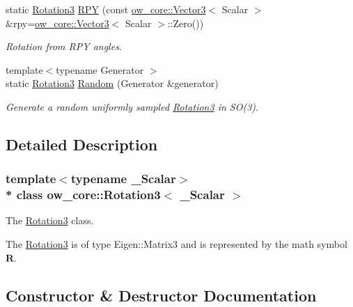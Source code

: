 \begin{DoxyCompactItemize}
static \hyperlink{classow__core_1_1Rotation3}{Rotation3} \hyperlink{classow__core_1_1Rotation3_ac97f635a2d188808d45496941384698a}{R\+PY} (const \hyperlink{classow__core_1_1Vector3}{ow\+\_\+core\+::\+Vector3}$<$ Scalar $>$ \&rpy=\hyperlink{classow__core_1_1Vector3}{ow\+\_\+core\+::\+Vector3}$<$ Scalar $>$\+::Zero())
\begin{DoxyCompactList}\small\item\em Rotation from R\+PY angles. \end{DoxyCompactList}\item 
{\footnotesize template$<$typename Generator $>$ }\\static \hyperlink{classow__core_1_1Rotation3}{Rotation3} \hyperlink{classow__core_1_1Rotation3_a0db10fdf9da785d9794ed715f2421382}{Random} (Generator \&generator)
\begin{DoxyCompactList}\small\item\em Generate a random uniformly sampled \hyperlink{classow__core_1_1Rotation3}{Rotation3} in S\+O(3). \end{DoxyCompactList}\end{DoxyCompactItemize}


\subsection{Detailed Description}
\subsubsection*{template$<$typename \+\_\+\+Scalar$>$\\*
class ow\+\_\+core\+::\+Rotation3$<$ \+\_\+\+Scalar $>$}

The \hyperlink{classow__core_1_1Rotation3}{Rotation3} class. 

The \hyperlink{classow__core_1_1Rotation3}{Rotation3} is of type Eigen\+::\+Matrix3 and is represented by the math symbol $\mathbf{R}$. 

\subsection{Constructor \& Destructor Documentation}
